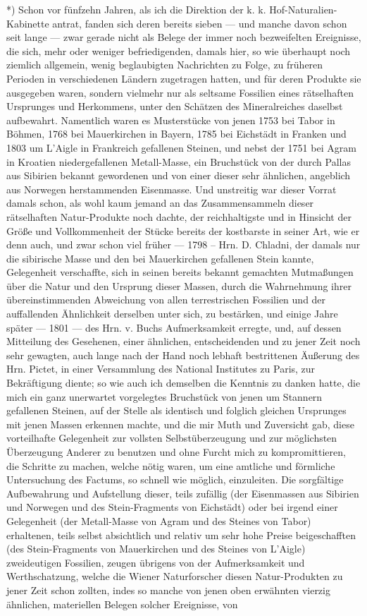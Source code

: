 \documentclass[a4paper, 11pt, oneside, german]{article}
\begin{document}
*) Schon vor fünfzehn Jahren, als ich die Direktion der k. k. Hof-Naturalien-Kabinette antrat, fanden sich deren bereits sieben --- und manche davon schon seit lange --- zwar gerade nicht als Belege der immer noch bezweifelten Ereignisse, die sich, mehr oder weniger befriedigenden, damals hier, so wie überhaupt noch ziemlich allgemein, wenig beglaubigten Nachrichten zu Folge, zu früheren Perioden in verschiedenen Ländern zugetragen hatten, und für deren Produkte sie ausgegeben waren, sondern vielmehr nur als seltsame Fossilien eines rätselhaften Ursprunges und Herkommens, unter den Schätzen des Mineralreiches daselbst aufbewahrt. Namentlich waren es Musterstücke von jenen 1753 bei Tabor in Böhmen, 1768 bei Mauerkirchen in Bayern, 1785 bei Eichstädt in Franken und 1803 um L'Aigle in Frankreich gefallenen Steinen, und nebst der 1751 bei Agram in Kroatien niedergefallenen Metall-Masse, ein Bruchstück von der durch Pallas aus Sibirien bekannt gewordenen und von einer dieser sehr ähnlichen, angeblich aus Norwegen herstammenden Eisenmasse. Und unstreitig war dieser Vorrat damals schon, als wohl kaum jemand an das Zusammensammeln dieser rätselhaften Natur-Produkte noch dachte, der reichhaltigste und in Hinsicht der Größe und Vollkommenheit der Stücke bereits der kostbarste in seiner Art, wie er denn auch, und zwar schon viel früher --- 1798 -- Hrn. D. Chladni, der damals nur die sibirische Masse und den bei Mauerkirchen gefallenen Stein kannte, Gelegenheit verschaffte, sich in seinen bereits bekannt gemachten Mutmaßungen über die Natur und den Ursprung dieser Massen, durch die Wahrnehmung ihrer übereinstimmenden Abweichung von allen terrestrischen Fossilien und der auffallenden Ähnlichkeit derselben unter sich, zu bestärken, und einige Jahre später --- 1801 --- des Hrn. v. Buchs Aufmerksamkeit erregte, und, auf dessen Mitteilung des Gesehenen, einer ähnlichen, entscheidenden und zu jener Zeit noch sehr gewagten, auch lange nach der Hand noch lebhaft bestrittenen Äußerung des Hrn. Pictet, in einer Versammlung des National Institutes zu Paris, zur Bekräftigung diente; so wie auch ich demselben die Kenntnis zu danken hatte, die mich ein ganz unerwartet vorgelegtes Bruchstück von jenen um Stannern gefallenen Steinen, auf der Stelle als identisch und folglich gleichen Ursprunges mit jenen Massen erkennen machte, und die mir Muth und Zuversicht gab, diese vorteilhafte Gelegenheit zur vollsten Selbstüberzeugung und zur möglichsten Überzeugung Anderer zu benutzen und ohne Furcht mich zu kompromittieren, die Schritte zu machen, welche nötig waren, um eine amtliche und förmliche Untersuchung des Factums, so schnell wie möglich, einzuleiten. Die sorgfältige Aufbewahrung und Aufstellung dieser, teils zufällig (der Eisenmassen aus Sibirien und Norwegen und des Stein-Fragments von Eichstädt) oder bei irgend einer Gelegenheit (der Metall-Masse von Agram und des Steines von Tabor) erhaltenen, teils selbst absichtlich und relativ um sehr hohe Preise beigeschafften (des Stein-Fragments von Mauerkirchen und des Steines von L'Aigle) zweideutigen Fossilien, zeugen übrigens von der Aufmerksamkeit und Werthschatzung, welche die Wiener Naturforscher diesen Natur-Produkten zu jener Zeit schon zollten, indes so manche von jenen oben erwähnten vierzig ähnlichen, materiellen Belegen solcher Ereignisse, von 
\end{document}
